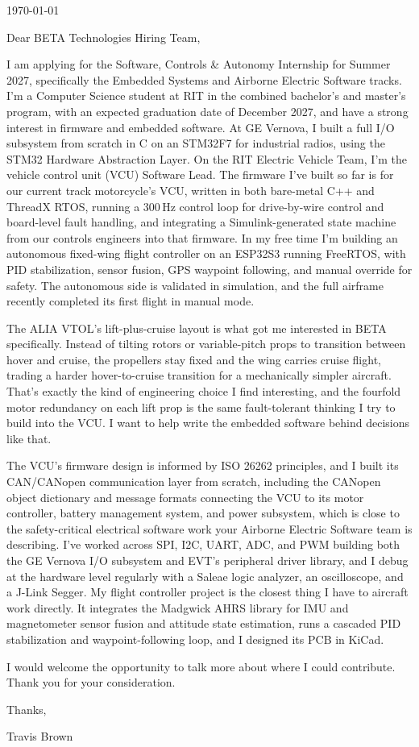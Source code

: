 \documentclass[11pt]{article}
\begin{document}
\begin{flushright}
  \today
\end{flushright}

\vspace{4pt}

Dear BETA Technologies Hiring Team,

I am applying for the Software, Controls \& Autonomy Internship for Summer
2027, specifically the Embedded Systems and Airborne Electric Software
tracks. I'm a Computer Science student at RIT in the combined bachelor's and
master's program, with an expected graduation date of December 2027, and
have a strong interest in firmware and embedded software. At GE Vernova, I
built a full I/O subsystem from scratch in C on an STM32F7 for industrial
radios, using the STM32 Hardware Abstraction Layer. On the RIT Electric
Vehicle Team, I'm the vehicle control unit (VCU) Software Lead. The firmware
I've built so far is for our current track motorcycle's VCU, written in both
bare-metal C++ and ThreadX RTOS, running a 300\,Hz control loop for
drive-by-wire control and board-level fault handling, and integrating a
Simulink-generated state machine from our controls engineers into that
firmware. In my free time I'm building
an autonomous fixed-wing flight controller on an ESP32S3 running FreeRTOS,
with PID stabilization, sensor fusion, GPS waypoint following, and manual
override for safety. The autonomous side is validated in simulation, and the
full airframe recently completed its first flight in manual mode.

The ALIA VTOL's lift-plus-cruise layout is what got me interested in BETA
specifically. Instead of tilting rotors or variable-pitch props to
transition between hover and cruise, the propellers stay fixed and the wing
carries cruise flight, trading a harder hover-to-cruise transition for a
mechanically simpler aircraft. That's exactly the kind of engineering
choice I find interesting, and the fourfold motor redundancy on each lift
prop is the same fault-tolerant thinking I try to build into the VCU. I want
to help write the embedded software behind decisions like that.

The VCU's firmware design is informed by ISO 26262 principles, and I built
its CAN/CANopen communication layer from scratch, including the CANopen
object dictionary and message formats connecting the VCU to its motor
controller, battery management system, and power subsystem, which is close
to the safety-critical electrical software work your Airborne Electric
Software team is describing. I've worked across SPI, I2C, UART, ADC, and PWM building
both the GE Vernova I/O subsystem and EVT's peripheral driver library, and I
debug at the hardware level regularly with a Saleae logic analyzer, an
oscilloscope, and a J-Link Segger. My flight controller project is the
closest thing I have to aircraft work directly. It integrates the Madgwick
AHRS library for IMU and magnetometer sensor fusion and attitude state
estimation, runs a cascaded PID
stabilization and waypoint-following loop, and I designed its PCB in KiCad.

I would welcome the opportunity to talk more about where I could contribute.
Thank you for your consideration.

Thanks,

Travis Brown
\end{document}
